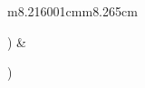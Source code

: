 \documentclass[a4paper]{article}
\makeatletter
\newcommand\arraybslash{\let\\\@arraycr}
\makeatother
\begin{document}
\begin{flushleft}
\tablefirsthead{}
\tablehead{}
\tabletail{}
\tablelasttail{}
\begin{supertabular}{m{8.216001cm}m{8.265cm}}
{%
 \par}
\centering {\cyra}) {\CYRD}{\cyrv}{\cyru}{\cyrh}{\cyrc}{\cyre}{\cyrn}{\cyrt}{\cyrr}{\cyro}{\cyrv}{\cyrery}{\cyrishrt}
{\cyrp}{\cyro}{\cyrt}{\cyre}{\cyrn}{\cyrc}{\cyri}{\cyra}{\cyrl} &
{%
 \par}
\centering\arraybslash {\cyrb})
{\CYRD}{\cyrv}{\cyru}{\cyrh}{\cyrc}{\cyre}{\cyrn}{\cyrt}{\cyrr}{\cyro}{\cyrv}{\cyrery}{\cyrishrt}
{\cyrp}{\cyro}{\cyrt}{\cyre}{\cyrn}{\cyrc}{\cyri}{\cyra}{\cyrl}\\
\\
\end{supertabular}
\end{flushleft}

\bigskip


\bigskip


\bigskip
\end{document}
